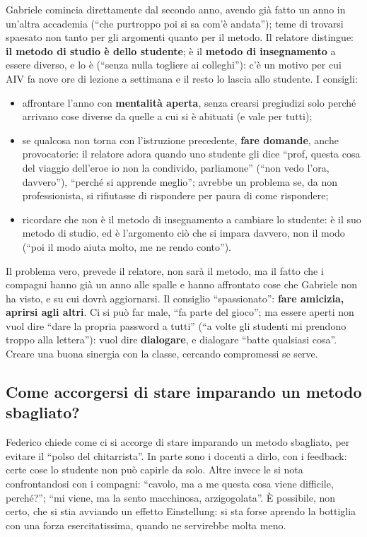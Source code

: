 Gabriele comincia direttamente dal secondo anno, avendo già fatto un anno in
un'altra accademia (``che purtroppo poi si sa com'è andata''); teme di
trovarsi spaesato non tanto per gli argomenti quanto per il metodo. Il
relatore distingue: \textbf{il metodo di studio è dello studente}; è il
\textbf{metodo di insegnamento} a essere diverso, e lo è (``senza nulla
togliere ai colleghi''): c'è un motivo per cui AIV fa nove ore di lezione a
settimana e il resto lo lascia allo studente. I consigli:
\begin{itemize}
  \item affrontare l'anno con \textbf{mentalità aperta}, senza crearsi
        pregiudizi solo perché arrivano cose diverse da quelle a cui si è
        abituati (e vale per tutti);
  \item se qualcosa non torna con l'istruzione precedente, \textbf{fare
        domande}, anche provocatorie: il relatore adora quando uno studente
        gli dice ``prof, questa cosa del viaggio dell'eroe io non la
        condivido, parliamone'' (``non vedo l'ora, davvero''), ``perché si
        apprende meglio''; avrebbe un problema se, da non professionista, si
        rifiutasse di rispondere per paura di come rispondere;
  \item ricordare che non è il metodo di insegnamento a cambiare lo
        studente: è il suo metodo di studio, ed è l'argomento ciò che si
        impara davvero, non il modo (``poi il modo aiuta molto, me ne rendo
        conto'').
\end{itemize}
Il problema vero, prevede il relatore, non sarà il metodo, ma il fatto che i
compagni hanno già un anno alle spalle e hanno affrontato cose che Gabriele
non ha visto, e su cui dovrà aggiornarsi. Il consiglio ``spassionato'':
\textbf{fare amicizia, aprirsi agli altri}. Ci si può far male, ``fa parte
del gioco''; ma essere aperti non vuol dire ``dare la propria password a
tutti'' (``a volte gli studenti mi prendono troppo alla lettera''): vuol
dire \textbf{dialogare}, e dialogare ``batte qualsiasi cosa''. Creare una
buona sinergia con la classe, cercando compromessi se serve.

\subsection{Come accorgersi di stare imparando un metodo sbagliato?}

Federico chiede come ci si accorge di stare imparando un metodo sbagliato,
per evitare il ``polso del chitarrista''. In parte sono i docenti a dirlo,
con i feedback: certe cose lo studente non può capirle da solo. Altre invece
le si nota confrontandosi con i compagni: ``cavolo, ma a me questa cosa
viene difficile, perché?''; ``mi viene, ma la sento macchinosa,
arzigogolata''. È possibile, non certo, che si stia avviando un effetto
Einstellung: si sta forse aprendo la bottiglia con una forza esercitatissima,
quando ne servirebbe molta meno.

